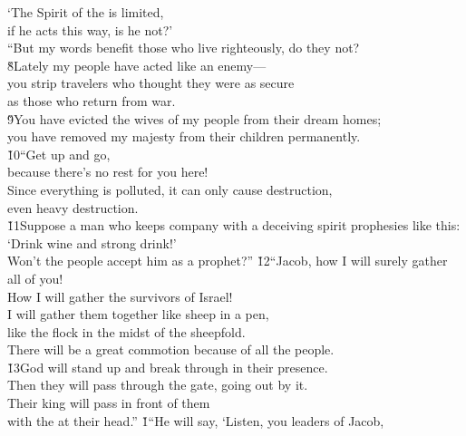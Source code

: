\begin{poetry}
\poemll    `The Spirit of the  is limited, \\
\poemlll       if he acts this way, is he not?' \\
\poeml ``But my words benefit those who live righteously, do they not? \\
\poeml \v{8}Lately my people have acted like an enemy--- \\
\poemll    you strip travelers who thought they were as secure \\
\poemlll       as those who return from war. \\
\poeml \v{9}You have evicted the wives of my people from their dream homes; \\
\poemll    you have removed my majesty from their children permanently. \\
\poeml \v{10}``Get up and go, \\
\poemll    because there's no rest for you here! \\
\poeml Since everything is polluted, it can only cause destruction, \\
\poemll    even heavy destruction. \\
\poeml \v{11}Suppose a man who keeps company with a deceiving spirit prophesies like this: \\
\poemll    `Drink wine and strong drink!' \\
\poemlll       Won't the people accept him as a prophet?''
\poeml \v{12}``Jacob, how I will surely gather all of you! \\
\poemll    How I will gather the survivors of Israel! \\
\poeml I will gather them together like sheep in a pen, \\
\poemll    like the flock in the midst of the sheepfold. \\
\poemlll       There will be a great commotion because of all the people. \\
\poeml \v{13}God will stand up and break through in their presence. \\
\poemll    Then they will pass through the gate, going out by it. \\
\poeml Their king will pass in front of them \\
\poemll    with the  at their head.''
\poeml {}
\v{1}``He will say, `Listen, you leaders of Jacob, \\

\end{poetry}
